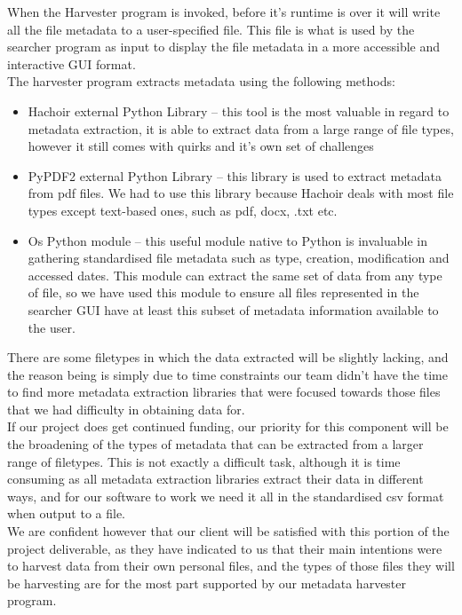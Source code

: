 \documentclass[11pt]{article}
\begin{document}
\begin{adjustwidth}{1cm}{}
When the Harvester program is invoked, before it’s runtime is over it will write all the file metadata to a user-specified file. This file is what is used by the searcher program as input to display the file metadata in a more accessible and interactive GUI format. \\

The harvester program extracts metadata using the following methods:

\begin{itemize}
\item Hachoir external Python Library – this tool is the most valuable in regard to metadata extraction, it is able to extract data from a large range of file types, however it still comes with quirks and it’s own set of challenges
\item PyPDF2 external Python Library – this library is used to extract metadata from pdf files. We had to use this library because Hachoir deals with most file types except text-based ones, such as pdf, docx, .txt etc. 
\item Os Python module – this useful module native to Python is invaluable in gathering standardised file metadata such as type, creation, modification and accessed dates. This module can extract the same set of data from any type of file, so we have used this module to ensure all files represented in the searcher GUI have at least this subset of metadata information available to the user.

\end{itemize}
	
There are some filetypes in which the data extracted will be slightly lacking, and the reason being is simply due to time constraints our team didn’t have the time to find more metadata extraction libraries that were focused towards those files that we had difficulty in obtaining data for. \\

If our project does get continued funding, our priority for this component will be the broadening of the types of metadata that can be extracted from a larger range of filetypes. This is not exactly a difficult task, although it is time consuming as all metadata extraction libraries extract their data in different ways, and for our software to work we need it all in the standardised csv format when output to a file. \\

We are confident however that our client will be satisfied with this portion of the project deliverable, as they have indicated to us that their main intentions were to harvest data from their own personal files, and the types of those files they will be harvesting are for the most part supported by our metadata harvester program. \\


\end{adjustwidth}
\end{document}
